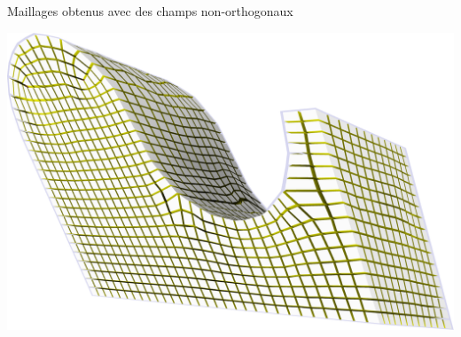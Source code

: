 \begin{frame}{Maillages obtenus avec des champs non-orthogonaux}
\begin{minipage}[c]{0.48\textwidth}
    \includegraphics[width=.7\textwidth]{img_spm_ff/shear_1.png}
\end{minipage}
\end{frame} 